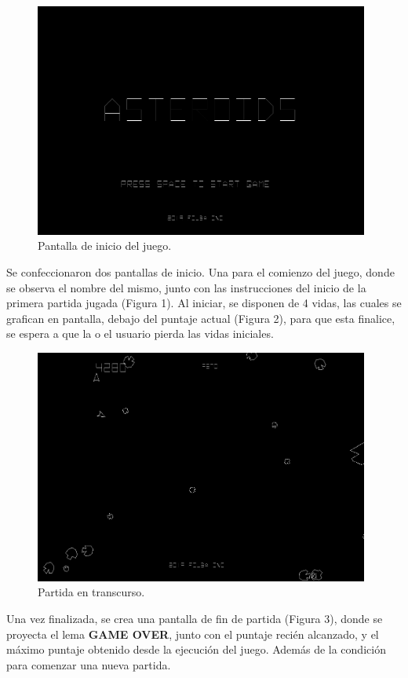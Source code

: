 \documentclass[a4paper, 12pt, spanish]{article}
\begin{document}
\begin{figure}[h!]
 	\centering
	\includegraphics[width=11cm]{start_screen}
	\caption{Pantalla de inicio del juego.}
\end{figure}

Se confeccionaron dos pantallas de inicio. Una para el comienzo del juego, donde se observa el nombre del mismo, junto con las instrucciones del inicio de la primera partida jugada (Figura 1). Al iniciar, se disponen de 4 vidas, las cuales se grafican en pantalla, debajo del puntaje actual (Figura 2), para que esta
finalice, se espera a que la o el usuario pierda las vidas iniciales.
\medskip

\begin{figure}[h!]
 	\centering
	\includegraphics[width=11cm]{juego} 
	\caption{Partida en transcurso.}
\end{figure}

Una vez finalizada, se crea una pantalla de fin de partida (Figura 3), donde se proyecta el lema \textbf{GAME OVER}, junto con el puntaje recién alcanzado, y el máximo puntaje obtenido desde la ejecución del juego. Además de la condición para comenzar una nueva partida.
\end{document}
